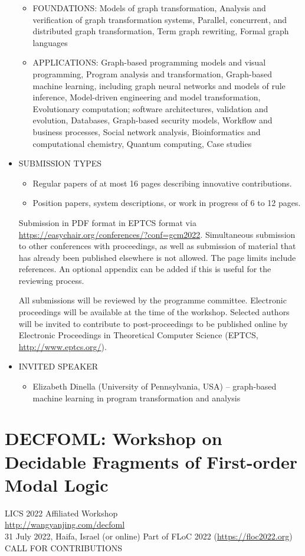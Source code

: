 \documentclass[prodmode,acmtecs]{acmsmall} %
\begin{document}
\begin{itemize}
\begin{itemize}\item  FOUNDATIONS: Models of graph transformation, Analysis and verification of graph transformation systems, Parallel, concurrent, and distributed graph transformation, Term graph rewriting, Formal graph languages
\item  APPLICATIONS: Graph-based programming models and visual programming, Program analysis and transformation, Graph-based machine learning, including graph neural networks and models of rule inference, Model-driven engineering and model transformation, Evolutionary computation; software architectures, validation and evolution, Databases, Graph-based security models, Workflow and business processes, Social network analysis, Bioinformatics and computational chemistry, Quantum computing, Case studies
\end{itemize} 
\item  SUBMISSION TYPES 
 
\begin{itemize}\item  Regular papers of at most 16 pages describing innovative contributions.
\item  Position papers, system descriptions, or work in progress of 6 to 12 pages.
\end{itemize} 
  Submission in PDF format in EPTCS format via \href{https://easychair.org/conferences/?conf=gcm2022}{https://easychair.org/conferences/?conf=gcm2022}. Simultaneous submission to other conferences with proceedings, as well as submission of material that has already been published elsewhere is not allowed. The page limits include references. An optional appendix can be added if this is useful for the reviewing process. 
 
  All submissions will be reviewed by the programme committee. Electronic proceedings will be available at the time of the workshop. Selected authors will be invited to contribute to post-proceedings to be published online by Electronic Proceedings in Theoretical Computer Science (EPTCS, \href{http://www.eptcs.org/}{http://www.eptcs.org/}). 
 
\item  INVITED SPEAKER 
 
\begin{itemize}\item  Elizabeth Dinella (University of Pennsylvania, USA) – graph-based machine learning in program transformation and analysis
\end{itemize} 
\end{itemize}\section{DECFOML: Workshop on Decidable Fragments of First-order Modal Logic }\label{DECFOML}  LICS 2022 Affiliated Workshop\\ 
  \href{http://wangyanjing.com/decfoml}{http://wangyanjing.com/decfoml} \\ 
  31 July 2022, Haifa, Israel (or online) Part of FLoC 2022 (\href{https://floc2022.org}{https://floc2022.org})\\ 
CALL FOR CONTRIBUTIONS 
\end{document}
